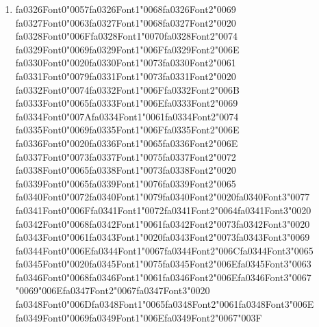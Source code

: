 \documentclass[12pt]{article}
\begin{document}
\begin{enumerate}[label=Q\arabic*.]
 \item {\csname fa0326Font0\endcsname\char"0057}{\csname fa0326Font1\endcsname\char"0068}{\csname fa0326Font2\endcsname\char"0069} {\csname fa0327Font0\endcsname\char"0063}{\csname fa0327Font1\endcsname\char"0068}{\csname fa0327Font2\endcsname\char"0020} {\csname fa0328Font0\endcsname\char"006F}{\csname fa0328Font1\endcsname\char"0070}{\csname fa0328Font2\endcsname\char"0074} {\csname fa0329Font0\endcsname\char"0069}{\csname fa0329Font1\endcsname\char"006F}{\csname fa0329Font2\endcsname\char"006E} {\csname fa0330Font0\endcsname\char"0020}{\csname fa0330Font1\endcsname\char"0073}{\csname fa0330Font2\endcsname\char"0061} {\csname fa0331Font0\endcsname\char"0079}{\csname fa0331Font1\endcsname\char"0073}{\csname fa0331Font2\endcsname\char"0020} {\csname fa0332Font0\endcsname\char"0074}{\csname fa0332Font1\endcsname\char"006F}{\csname fa0332Font2\endcsname\char"006B} {\csname fa0333Font0\endcsname\char"0065}{\csname fa0333Font1\endcsname\char"006E}{\csname fa0333Font2\endcsname\char"0069} {\csname fa0334Font0\endcsname\char"007A}{\csname fa0334Font1\endcsname\char"0061}{\csname fa0334Font2\endcsname\char"0074} {\csname fa0335Font0\endcsname\char"0069}{\csname fa0335Font1\endcsname\char"006F}{\csname fa0335Font2\endcsname\char"006E} {\csname fa0336Font0\endcsname\char"0020}{\csname fa0336Font1\endcsname\char"0065}{\csname fa0336Font2\endcsname\char"006E} {\csname fa0337Font0\endcsname\char"0073}{\csname fa0337Font1\endcsname\char"0075}{\csname fa0337Font2\endcsname\char"0072} {\csname fa0338Font0\endcsname\char"0065}{\csname fa0338Font1\endcsname\char"0073}{\csname fa0338Font2\endcsname\char"0020} {\csname fa0339Font0\endcsname\char"0065}{\csname fa0339Font1\endcsname\char"0076}{\csname fa0339Font2\endcsname\char"0065} {\csname fa0340Font0\endcsname\char"0072}{\csname fa0340Font1\endcsname\char"0079}{\csname fa0340Font2\endcsname\char"0020}{\csname fa0340Font3\endcsname\char"0077} {\csname fa0341Font0\endcsname\char"006F}{\csname fa0341Font1\endcsname\char"0072}{\csname fa0341Font2\endcsname\char"0064}{\csname fa0341Font3\endcsname\char"0020} {\csname fa0342Font0\endcsname\char"0068}{\csname fa0342Font1\endcsname\char"0061}{\csname fa0342Font2\endcsname\char"0073}{\csname fa0342Font3\endcsname\char"0020} {\csname fa0343Font0\endcsname\char"0061}{\csname fa0343Font1\endcsname\char"0020}{\csname fa0343Font2\endcsname\char"0073}{\csname fa0343Font3\endcsname\char"0069} {\csname fa0344Font0\endcsname\char"006E}{\csname fa0344Font1\endcsname\char"0067}{\csname fa0344Font2\endcsname\char"006C}{\csname fa0344Font3\endcsname\char"0065} {\csname fa0345Font0\endcsname\char"0020}{\csname fa0345Font1\endcsname\char"0075}{\csname fa0345Font2\endcsname\char"006E}{\csname fa0345Font3\endcsname\char"0063} {\csname fa0346Font0\endcsname\char"0068}{\csname fa0346Font1\endcsname\char"0061}{\csname fa0346Font2\endcsname\char"006E}{\csname fa0346Font3\endcsname\char"0067} {\char"0069}{\char"006E}{\csname fa0347Font2\endcsname\char"0067}{\csname fa0347Font3\endcsname\char"0020} {\csname fa0348Font0\endcsname\char"006D}{\csname fa0348Font1\endcsname\char"0065}{\csname fa0348Font2\endcsname\char"0061}{\csname fa0348Font3\endcsname\char"006E} {\csname fa0349Font0\endcsname\char"0069}{\csname fa0349Font1\endcsname\char"006E}{\csname fa0349Font2\endcsname\char"0067}{\char"003F}

\end{enumerate}
\end{document}
